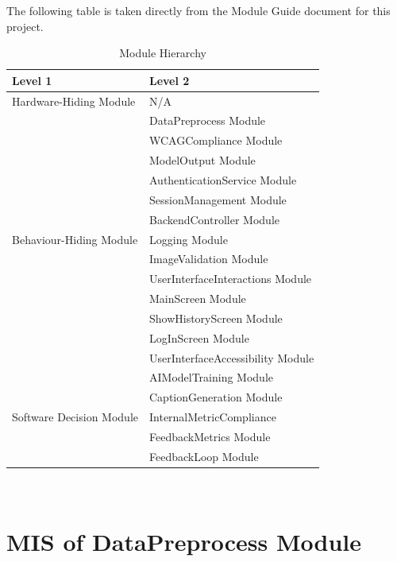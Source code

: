 \documentclass[12pt, titlepage]{article}
\begin{document}
The following table is taken directly from the Module Guide document
for this project.
\begin{table}[h!]
  \centering
  \begin{tabular}{p{} p{}}
    \toprule
    \textbf{Level 1} & \textbf{Level 2}\\
    \midrule

    {Hardware-Hiding Module} & N/A \\
    \midrule

    \multirow{13}{0.3\textwidth}{Behaviour-Hiding Module} &
    {DataPreprocess Module}\\ &
    {WCAGCompliance Module}\\ &
    {ModelOutput Module}\\ &
    {AuthenticationService Module}\\ &
    {SessionManagement Module}\\ &
    {BackendController Module}\\ &
    {Logging Module}\\ &
    {ImageValidation Module}\\ &
    {UserInterfaceInteractions Module} \\ &
    {MainScreen Module} \\ &
    {ShowHistoryScreen Module} \\ &
    {LogInScreen Module} \\ &
    {UserInterfaceAccessibility Module} \\
    \midrule

    \multirow{6}{0.3\textwidth}{Software Decision Module} &
    {AIModelTraining Module }\\ &
    {CaptionGeneration Module}\\ &
    {InternalMetricCompliance}\\ &
    {FeedbackMetrics Module}\\ &
    {FeedbackLoop Module}\\
    \bottomrule
  \end{tabular}
  \caption{Module Hierarchy}
  \label{TblMH}
\end{table}

\newpage
~\newpage


\section{MIS of DataPreprocess Module} \label{datapp}
\end{document}
